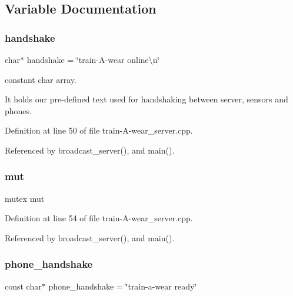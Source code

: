 \subsection{Variable Documentation}
\mbox{\label{train-_a-wear__server_8cpp_a0f2faa14b725237d13bb7d2e8b7e3942}} 
\subsubsection{\texorpdfstring{handshake}{handshake}}
{\footnotesize\ttfamily char$\ast$ handshake = \char`\"{}train-\/A-\/wear online\textbackslash{}n\char`\"{}}



constant char array. 

It holds our pre-\/defined text used for handshaking between server, sensors and phones. 

Definition at line 50 of file train-\/\+A-\/wear\+\_\+server.\+cpp.



Referenced by broadcast\+\_\+server(), and main().

\mbox{\label{train-_a-wear__server_8cpp_a8068724ec29d6e66aad75c716e138db3}} 
\subsubsection{\texorpdfstring{mut}{mut}}
{\footnotesize\ttfamily mutex mut}



Definition at line 54 of file train-\/\+A-\/wear\+\_\+server.\+cpp.



Referenced by broadcast\+\_\+server(), and main().

\mbox{\label{train-_a-wear__server_8cpp_aba845a1aa2054e7dadd0653a67b549f4}} 
\subsubsection{\texorpdfstring{phone\_handshake}{phone\_handshake}}
{\footnotesize\ttfamily const char$\ast$ phone\+\_\+handshake = \char`\"{}train-\/a-\/wear ready\char`\"{}}



